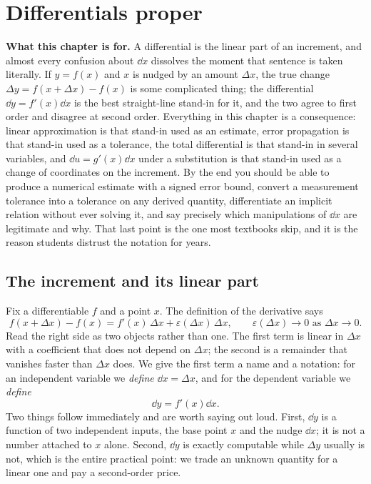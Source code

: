 \chapter{Differentials proper}

\begin{orient}
\textbf{What this chapter is for.} A differential is the linear part of an increment, and almost every confusion about $\dd x$ dissolves the moment that sentence is taken literally. If $y=f(x)$ and $x$ is nudged by an amount $\Delta x$, the true change $\Delta y=f(x+\Delta x)-f(x)$ is some complicated thing; the differential $\dd y=f'(x)\dd x$ is the best straight-line stand-in for it, and the two agree to first order and disagree at second order. Everything in this chapter is a consequence: linear approximation is that stand-in used as an estimate, error propagation is that stand-in used as a tolerance, the total differential is that stand-in in several variables, and $\dd u=g'(x)\dd x$ under a substitution is that stand-in used as a change of coordinates on the increment. By the end you should be able to produce a numerical estimate with a signed error bound, convert a measurement tolerance into a tolerance on any derived quantity, differentiate an implicit relation without ever solving it, and say precisely which manipulations of $\dd x$ are legitimate and why. That last point is the one most textbooks skip, and it is the reason students distrust the notation for years.
\end{orient}

\section{The increment and its linear part}

Fix a differentiable $f$ and a point $x$. The definition of the derivative says
\[f(x+\Delta x)-f(x)=f'(x)\,\Delta x+\varepsilon(\Delta x)\,\Delta x,\qquad \varepsilon(\Delta x)\to0 \text{ as } \Delta x\to0.\]
Read the right side as two objects rather than one. The first term is linear in $\Delta x$ with a coefficient that does not depend on $\Delta x$; the second is a remainder that vanishes faster than $\Delta x$ does. We give the first term a name and a notation: for an independent variable we \emph{define} $\dd x=\Delta x$, and for the dependent variable we \emph{define}
\[\dd y=f'(x)\dd x.\]
Two things follow immediately and are worth saying out loud. First, $\dd y$ is a function of two independent inputs, the base point $x$ and the nudge $\dd x$; it is not a number attached to $x$ alone. Second, $\dd y$ is exactly computable while $\Delta y$ usually is not, which is the entire practical point: we trade an unknown quantity for a linear one and pay a second-order price.

